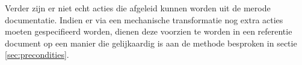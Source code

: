 Verder zijn er niet echt acties die afgeleid kunnen worden uit de merode documentatie. 
Indien er via een mechanische transformatie nog extra acties moeten gespecifieerd worden, dienen deze voorzien te worden in een referentie document op een manier die gelijkaardig is aan de methode besproken in sectie \ref{sec:precondities}.
